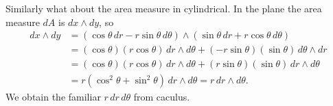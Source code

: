 \documentclass[12pt]{article}
\begin{document}
Similarly what about the area measure in cylindrical.  In the plane
the area measure $dA$ is $dx \wedge dy$, so
\begin{equation*}
\begin{split}
dx \wedge dy
& =
(\cos \theta \, dr - r \sin \theta \, d \theta)
\wedge
(\sin \theta \, dr + r \cos \theta \, d \theta)
\\
& =
(\cos \theta) (r \cos \theta) \, dr \wedge d\theta
+
(-r \sin \theta) (\sin \theta) \, d\theta \wedge dr
\\
& =
(\cos \theta) (r \cos \theta) \, dr \wedge d\theta
+
(r \sin \theta) (\sin \theta) \, dr \wedge d\theta
\\
& =
r(\cos^2 \theta + \sin^2 \theta) \, dr \wedge d\theta
=
r \, dr \wedge d\theta .
\end{split}
\end{equation*}
We obtain the familiar $r \,dr \,d\theta$ from caculus.
\end{document}
